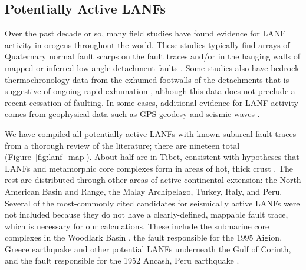 \documentclass[twocolumn,grl]{AGUTeX}
\begin{document}
\begin{article}
\section{Potentially Active LANFs}

Over the past decade or so, many field studies have found evidence for LANF activity in orogens throughout the world. These studies typically find arrays of Quaternary normal fault scarps on the fault traces and/or in the hanging walls of mapped or inferred low-angle detachment faults \citep [e.g.,][]{axen1999baja}. Some studies also have bedrock thermochronology data from the exhumed footwalls of the detachments that is suggestive of ongoing rapid exhumation \citep [e.g.,][]{sundell2013lunggar}, although this data does not preclude a recent cessation of faulting. In some cases, additional evidence for LANF activity comes from geophysical data such as GPS geodesy \citep [e.g.,][]{hreinsdottir2009altotib} and seismic waves \citep [e.g.,][]{doser1987ancash}.

We have compiled all potentially active LANFs with known subareal fault traces from a thorough review of the literature; there are nineteen total (Figure~\ref{fig:lanf_map}).  About half are in Tibet, consistent with hypotheses that LANFs and metamorphic core complexes form in areas of hot, thick crust \citep [e.g.,][]{buck1991mcc}.  The rest are distributed through other areas of active continental extension: the North American Basin and Range, the Malay Archipelago, Turkey, Italy, and Peru. Several of the most-commonly cited candidates for seismically active LANFs were not included because they do not have a clearly-defined, mappable fault trace, which is necessary for our calculations.  These include the submarine core complexes in the Woodlark Basin \citep{abers2001}, the fault responsible for the 1995 Aigion, Greece earthquake \citep{bernard1997} and other potential LANFs underneath the Gulf of Corinth, and the fault responsible for the 1952 Ancash, Peru earthquake \citep{doser1987ancash}.



\end{article}
\end{document}
